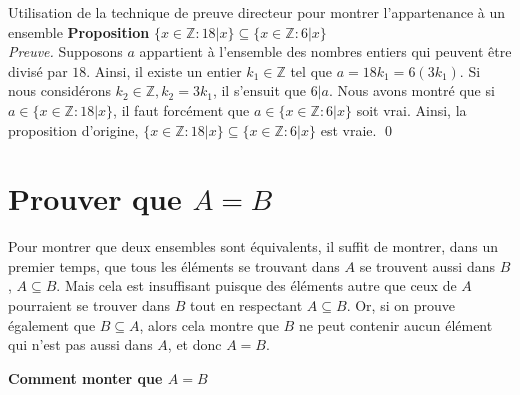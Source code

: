 \documentclass[16pt]{report}
\begin{document}
\begin{multicols*}{2}
            \begin{Preuve}{Utilisation de la technique de preuve directeur pour montrer l'appartenance à un ensemble}{}
                \textbf{Proposition} \quad $\{ x \in \mathbb{Z} : 18|x \} \subseteq \{ x \in \mathbb{Z} : 6|x \}$
                \vspace{1em}\\ 
                \textit{Preuve.} \quad Supposons   $a$ appartient à l'ensemble des nombres entiers qui peuvent 
                être divisé par $18$. Ainsi, il existe un entier $k_1 \in \mathbb{Z}$ tel que 
                $ a = 18k_1 = 6(3k_1)$. Si nous considérons $k_2 \in \mathbb{Z}, k_2 = 3k_1$, il s'ensuit que 
                $6 | a$. Nous avons montré que si $a \in \{ x \in \mathbb{Z} : 18|x \}$,  il faut 
                forcément que $a \in \{ x \in \mathbb{Z} : 6|x \}$ soit vrai. Ainsi, la proposition d'origine,
                $\{ x \in \mathbb{Z} : 18|x \} \subseteq \{ x \in \mathbb{Z} : 6|x \}$ est vraie. \qed

            \end{Preuve}






            \section{\textbf{\textcolor{myp}{Prouver que $A = B$}}}

           Pour montrer que deux ensembles sont équivalents, il suffit de montrer, dans un premier temps, que 
           tous les éléments se trouvant dans $A$ se trouvent aussi dans $B$, $A \subseteq B$. Mais cela est 
           insuffisant puisque des éléments autre que ceux de $A$ pourraient se trouver dans $B$ tout en 
           respectant $A \subseteq B$. Or, si on prouve également que $B \subseteq A$, alors cela montre que 
           $B$ ne peut contenir aucun élément qui n'est pas aussi dans $A$, et donc $A = B$. 



            \begin{center}
                \textbf{Comment monter que $A = B$} 
            \noindent{}
\end{center}
\end{multicols*}
\end{document}
